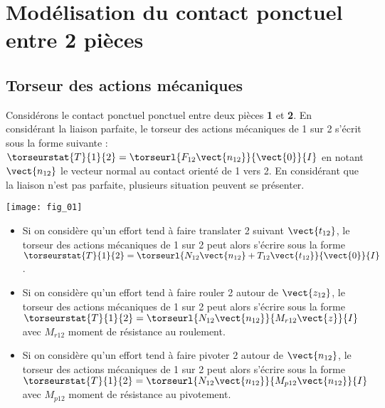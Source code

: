%



%





\section{Modélisation du contact ponctuel entre 2 pièces}
\subsection{Torseur des actions mécaniques}
Considérons le contact ponctuel ponctuel entre deux pièces \textbf{1} et \textbf{2}. En considérant la liaison parfaite, le torseur des actions mécaniques de 1 sur 2 s'écrit sous la forme suivante : $\torseurstat{T}{1}{2}=\torseurl{F_{12} \vect{n_{12}}}{\vect{0}}{I}$ en notant $\vect{n_{12}}$ le vecteur normal au contact orienté de 1 vers 2. 
En considérant que la liaison n'est pas parfaite, plusieurs situation peuvent se présenter.  



\begin{marginfigure}%
\begin{center}
\texttt{[image: fig\_01]}
\end{center}
\end{marginfigure}

\begin{itemize}
\item Si on considère qu'un effort tend à faire translater 2 suivant $\vect{t_{12}}$, le torseur des actions mécaniques de 1 sur 2 peut alors s'écrire sous la forme $\torseurstat{T}{1}{2}=\torseurl{N_{12} \vect{n_{12}}+T_{12} \vect{t_{12}}}{\vect{0}}{I}$.
\item Si on considère qu'un effort tend à faire rouler 2 autour de $\vect{z_{12}}$, le torseur des actions mécaniques de 1 sur 2 peut alors s'écrire sous la forme $\torseurstat{T}{1}{2}=\torseurl{N_{12} \vect{n_{12}}}{M_{r12} \vect{z}}{I}$ avec $M_{r12}$ moment de résistance au roulement.
\item Si on considère qu'un effort tend à faire pivoter 2 autour de $\vect{n_{12}}$, le torseur des actions mécaniques de 1 sur 2 peut alors s'écrire sous la forme $\torseurstat{T}{1}{2}=\torseurl{N_{12} \vect{n_{12}}}{M_{p12} \vect{n_{12}}}{I}$ avec $M_{p12}$ moment de résistance au pivotement.
\end{itemize}

